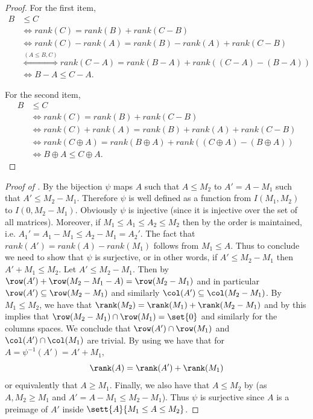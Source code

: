 \begin{proof}
    For the first item,
    \begin{align*}
        B &\leq C \\
        &\Leftrightarrow rank(C) = rank(B) + rank(C-B) \\
        &\Leftrightarrow rank(C) - rank(A) = rank(B) - rank (A) + rank(C- B) \\
        &\overset{(A \leq B,C)}{\Leftrightarrow} rank (C-A) = rank(B-A) + rank((C-A) - (B-A)) \\
        &\Leftrightarrow B-A \leq C-A.
    \end{align*}

    For the second item,
    \begin{align*}
        B &\leq C \\
        &\Leftrightarrow rank(C) = rank(B) + rank(C-B) \\
        &\Leftrightarrow rank(C) + rank(A) = rank(B) + rank (A) + rank(C- B) \\
        &\Leftrightarrow rank (C \oplus A) = rank(B \oplus A) + rank((C\oplus A) - (B \oplus A)) \\
        &\Leftrightarrow B \oplus A \leq C \oplus A.
    \end{align*}
\end{proof}

\begin{proof}[Proof of ]
    By  the bijection \(\psi\) maps \(A\) such that \(A \leq M_2\) to \(A'=A- M_1\) such that \(A' \leq M_2 - M_1\). Therefore \(\psi\) is well defined as a function from \(I(M_1,M_2)\) to \(I(0,M_2-M_1)\). Obviously \(\psi\) is injective (since it is injective over the set of all matrices). Moreover, if \(M_1 \leq A_1 \leq A_2 \leq M_2\) then by  the order is maintained, i.e. \(A_1' = A_1 -M_1 \leq A_2 - M_1 = A_2'\). The fact that \(rank(A') = rank(A) - rank(M_1)\) follows from \(M_1 \leq A\). Thus to conclude we need to show that \(\psi\) is surjective, or in other words, if \(A' \leq M_2 - M_1\) then \(A' + M_1 \leq M_2\). Let \(A' \leq M_2 - M_1\). Then by 
    \(\row(A') + \row(M_2 -M_1 - A) = \row(M_2 - M_1)\) and in particular \(\row(A') \subseteq \row(M_2 - M_1)\) and similarly \(\col(A') \subseteq \col(M_2-M_1)\). By \(M_1 \leq M_2\), we have that \(\rank(M_2) = \rank(M_1) + \rank(M_2 - M_1)\) and by  this implies that \(\row(M_2-M_1) \cap \row(M_1) = \set{0}\) and similarly for the columns spaces. We conclude that \(\row(A') \cap \row(M_1)\) and \(\col(A') \cap \col(M_1)\) are trivial. By using  we have that for \(A = \psi^{-1}(A') = A' + M_1\),
    \[\rank(A) = \rank(A') + \rank(M_1)\]
    or equivalently that \(A \geq M_1\). Finally, we also have that \(A \leq M_2\) by  (as \(A,M_2 \geq M_1\) and \(A'=A-M_1 \leq M_2 - M_1\)). Thus \(\psi\) is surjective since \(A\) is a preimage of \(A'\) inside \(\sett{A}{M_1 \leq A \leq M_2}\).
\end{proof}

